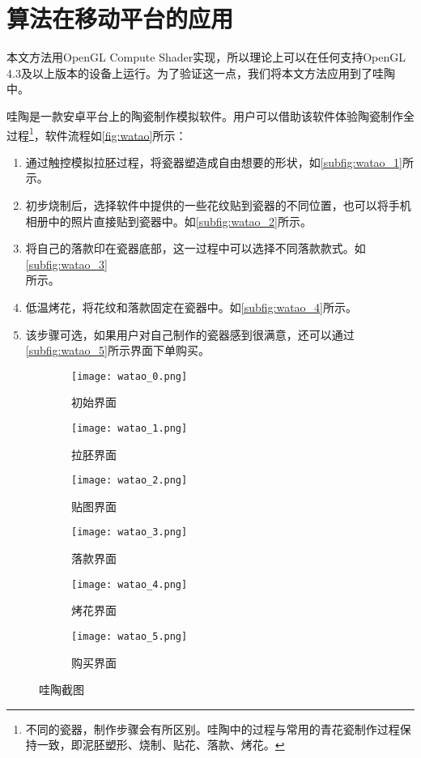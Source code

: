 \chapter{算法在移动平台的应用}
    本文方法用OpenGL Compute Shader实现，所以理论上可以在任何支持OpenGL 4.3及以上版本的设备上运行。为了验证这一点，我们将本文方法应用到了哇陶中。

    哇陶是一款安卓平台上的陶瓷制作模拟软件。用户可以借助该软件体验陶瓷制作全过程\footnote{不同的瓷器，制作步骤会有所区别。哇陶中的过程与常用的青花瓷制作过程保持一致，即泥胚塑形、烧制、贴花、落款、烤花。}，软件流程如\autoref{fig:watao}所示：
    \begin{enumerate}
        \item 通过触控模拟拉胚过程，将瓷器塑造成自由想要的形状，如\autoref{subfig:watao_1}所示。
        \item 初步烧制后，选择软件中提供的一些花纹贴到瓷器的不同位置，也可以将手机相册中的照片直接贴到瓷器中。如\autoref{subfig:watao_2}所示。
        \item 将自己的落款印在瓷器底部，这一过程中可以选择不同落款款式。如\autoref{subfig:watao_3}\\所示。
        \item 低温烤花，将花纹和落款固定在瓷器中。如\autoref{subfig:watao_4}所示。
        \item 该步骤可选，如果用户对自己制作的瓷器感到很满意，还可以通过\autoref{subfig:watao_5}所示界面下单购买。
    \end{enumerate}

\begin{figure}[htbp]
	\centering
	\begin{subfigure}[b]{.32\textwidth}
		\centering
		\texttt{[image: watao\_0.png]}
		\caption{初始界面}\label{subfig:watao_0}
	\end{subfigure}
	\begin{subfigure}[b]{.32\textwidth}
		\centering
		\texttt{[image: watao\_1.png]}
		\caption{拉胚界面}\label{subfig:watao_1}
	\end{subfigure}
	\begin{subfigure}[b]{.32\textwidth}
		\centering
		\texttt{[image: watao\_2.png]}
		\caption{贴图界面}\label{subfig:watao_2}
	\end{subfigure}

    \par
	\begin{subfigure}[b]{.32\textwidth}
		\centering
		\texttt{[image: watao\_3.png]}
		\caption{落款界面}\label{subfig:watao_3}
	\end{subfigure}
	\begin{subfigure}[b]{.32\textwidth}
		\centering
		\texttt{[image: watao\_4.png]}
		\caption{烤花界面}\label{subfig:watao_4}
	\end{subfigure}
	\begin{subfigure}[b]{.32\textwidth}
		\centering
		\texttt{[image: watao\_5.png]}
		\caption{购买界面}\label{subfig:watao_5}
	\end{subfigure}

	\caption{哇陶截图}\label{fig:watao}
\end{figure}

